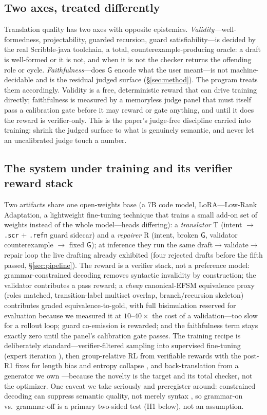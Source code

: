 \documentclass{article}
\newcommand{\gtG}{\mathsf{G}}
\begin{document}
\subsection{Two axes, treated differently}
Translation quality has two axes with opposite epistemics. \emph{Validity}---well-formedness, projectability, guarded recursion, guard satisfiability---is decided by the real Scribble-java toolchain, a total, counterexample-producing oracle: a draft is well-formed or it is not, and when it is not the checker returns the offending role or cycle. \emph{Faithfulness}---does $\gtG$ encode what the user meant---is not machine-decidable and is the residual judged surface (\S\ref{sec:method}). The program treats them accordingly. Validity is a free, deterministic reward that can drive training directly; faithfulness is measured by a memoryless judge panel that must itself pass a calibration gate before it may reward or gate anything, and until it does the reward is verifier-only. This is the paper's judge-free discipline carried into training: shrink the judged surface to what is genuinely semantic, and never let an uncalibrated judge touch a number.

\subsection{The system under training and its verifier reward stack}
Two artifacts share one open-weights base (a 7B code model, LoRA---Low-Rank Adaptation, a lightweight fine-tuning technique that trains a small add-on set of weights instead of the whole model---heads differing): a \emph{translator} T (intent $\to$ \texttt{.scr} $+$ \texttt{.refn} guard sidecar) and a \emph{repairer} R (intent, broken $\gtG$, validator counterexample $\to$ fixed $\gtG$); at inference they run the same draft$\to$validate$\to$repair loop the live drafting already exhibited (four rejected drafts before the fifth passed, \S\ref{sec:pipeline}). The reward is a verifier stack, not a preference model: grammar-constrained decoding removes syntactic invalidity by construction; the validator contributes a pass reward; a \emph{cheap} canonical-EFSM equivalence proxy (roles matched, transition-label multiset overlap, branch/recursion skeleton) contributes graded equivalence-to-gold, with full bisimulation reserved for evaluation because we measured it at $10$--$40\times$ the cost of a validation---too slow for a rollout loop; guard co-emission is rewarded; and the faithfulness term stays exactly zero until the panel's calibration gate passes. The training recipe is deliberately standard---verifier-filtered sampling into supervised fine-tuning (expert iteration \citep{star22}), then group-relative RL from verifiable rewards \citep{deepseekmath} with the post-R1 fixes for length bias and entropy collapse \citep{dapo,gspo,drgrpo}, and back-translation from a generator we own \citep{sennrich16,autoform}---because the novelty is the target and its total checker, not the optimizer. One caveat we take seriously and preregister around: constrained decoding can suppress semantic quality, not merely syntax \citep{formattax26,crane25}, so grammar-on vs.\ grammar-off is a primary two-sided test (H1 below), not an assumption.
\end{document}
